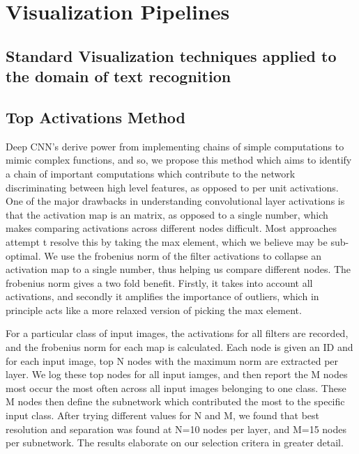 \documentclass[10pt,twocolumn,letterpaper]{article}
\begin{document}
\section{Visualization Pipelines}

\subsection{Standard Visualization techniques applied to the domain of text recognition}

\subsection{Top Activations Method}
Deep CNN's derive power from implementing chains of simple computations to mimic complex functions, and so, we propose this method which aims to identify a chain of important computations which contribute to the network discriminating between high level features, as opposed to per unit activations. One of the major drawbacks in understanding convolutional layer activations is that the activation map is an matrix, as opposed to a single number, which makes comparing activations across different nodes difficult. Most approaches attempt t resolve this by taking the max element, which we believe may be sub-optimal. We use the frobenius norm of the filter activations to collapse an activation map to a single number, thus helping us compare different nodes. The frobenius norm gives a two fold benefit. Firstly, it takes into account all activations, and secondly it amplifies the importance of outliers, which in principle acts like a more relaxed version of picking the max element. 

For a particular class of input images, the activations for all filters are recorded, and the frobenius norm for each map is calculated. Each node is given an ID and for each input image, top N nodes with the maximum norm are extracted per layer. We log these top nodes for all input iamges, and then report the M nodes most occur the most often across all input images belonging to one class. These M nodes then define the subnetwork which contributed the most to the specific input class. After trying different values for N and M, we found that best resolution and separation was found at N=10 nodes per layer, and M=15 nodes per subnetwork. The results elaborate on our selection critera in greater detail.
\end{document}
